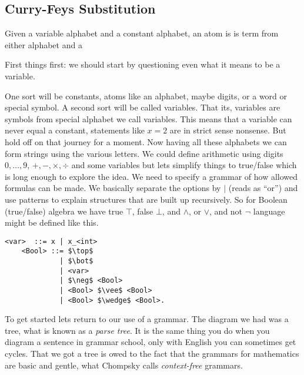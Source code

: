 \subsection{Curry-Feys Substitution}


\begin{definition}
    Given a variable alphabet and a constant alphabet, 
    an atom is is term from either alphabet and a 
    
\end{definition}
First things first: we should start by questioning even what it means to be a variable.



One sort will be constants, atoms like an alphabet, maybe digits, or a word or
special symbol. A second sort will be called variables. That its, variables are
symbols from special alphabet we call variables. This means that a variable can
never equal a constant, statements like $x=2$ are in strict sense nonsense.  But
hold off on that journey for a moment. Now having all these alphabets we can
form strings using the various letters. We could define arithmetic using digits
$0,\ldots, 9$, $+,-,\times,\div$ and some variables but lets simplify things to
true/false which is long enough to explore the idea.  We need to specify a
grammar of how allowed formulas can be made.  We basically separate the options
by $\mid$ (reads as ``or'') and use patterns to explain structures that are
built up recursively. So for Boolean (true/false) algebra we have true $\top$,
false $\bot$, and $\wedge$, or $\vee$, and not $\neg$ language might be defined
like this.
\newpage    
\begin{lstfloat}
\begin{lstlisting}[mathescape]
    <var>  ::= x | x_<int>
    <Bool> ::= $\top$ 
             | $\bot$ 
             | <var>
             | $\neg$ <Bool> 
             | <Bool> $\vee$ <Bool> 
             | <Bool> $\wedge$ <Bool>.
\end{lstlisting}
\end{lstfloat}

To get started lets return to our use of a grammar.  The diagram we had 
was a tree, what is known as a \emph{parse tree}.  It is the same thing you 
do when you diagram a sentence in grammar school, only with English you can 
sometimes get cycles.  That we got a tree is owed to the fact that the grammars 
for mathematics are basic and gentle, what Chompsky calls \emph{context-free} grammars.

